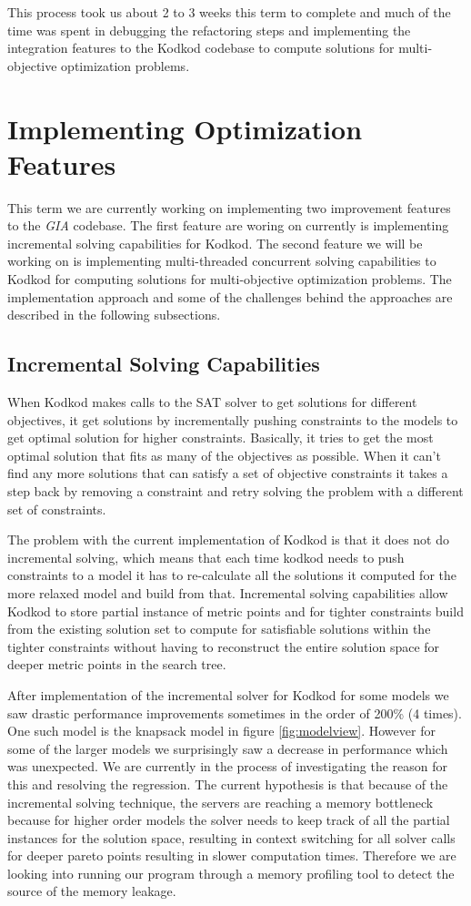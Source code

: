 \documentclass[11pt]{article}
\theoremstyle{definition}
\begin{document}
This process took us about 2 to 3 weeks this term to complete and much of the time was spent in debugging the refactoring steps and implementing the integration features to the Kodkod codebase to compute solutions for multi-objective optimization problems.

\section{Implementing Optimization Features}
This term we are currently working on implementing two improvement features to the \emph{GIA} codebase. The first feature are woring on currently is implementing incremental solving capabilities for Kodkod. The second feature we will be working on is implementing multi-threaded concurrent solving capabilities to Kodkod for computing solutions for multi-objective optimization problems. The implementation approach and some of the challenges behind the approaches are described in the following subsections.

\subsection{Incremental Solving Capabilities}
When Kodkod makes calls to the SAT solver to get solutions for different objectives, it get solutions by incrementally pushing constraints to the models to get optimal solution for higher constraints. Basically, it tries to get the most optimal solution that fits as many of the objectives as possible. When it can't find any more solutions that can satisfy a set of objective constraints it takes a step back by removing a constraint and retry solving the problem with a different set of constraints.

The problem with the current implementation of Kodkod is that it does not do incremental solving, which means that each time kodkod needs to push constraints to a model it has to re-calculate all the solutions it computed for the more relaxed model and build from that. Incremental solving capabilities allow Kodkod to store partial instance of metric points and for tighter constraints build from the existing solution set to compute for satisfiable solutions within the tighter constraints without having to reconstruct the entire solution space for deeper metric points in the search tree.

After implementation of the incremental solver for Kodkod for some models we saw drastic performance improvements sometimes in the order of 200\% (4 times). One such model is the knapsack model in figure \ref{fig:modelview}. However for some of the larger models we surprisingly saw a decrease in performance  which was unexpected. We are currently in the process of investigating the reason for this and resolving the regression. The current hypothesis is that because of the incremental solving technique, the servers are reaching a memory bottleneck because for higher order models the solver needs to keep track of all the partial instances for the solution space, resulting in context switching for all solver calls for deeper pareto points resulting in slower computation times. Therefore we are looking into running our program through a memory profiling tool to detect the source of the memory leakage.
\end{document}
